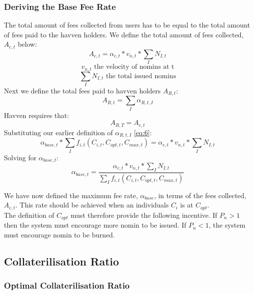 \subsubsection{Deriving the Base Fee Rate}The total amount of fees collected from users has to be equal to the total amount of fees paid to the havven holders. We define the total amount of fees collected, $A_{c,t}$ below: \\
\begin{equation}
A_{c,t}  = \alpha_{c,t} * v_{n,t} * \sum\limits_I N_{I,t}  \label{eq:8}
\end{equation}
$$ v_{n,t} \text{ the velocity of nomins at t} $$
$$  \sum\limits_I N_{I,t} \text{ the total issued nomins} $$
Next we define the total fees paid to havven holders $A_{R,t}$: \\
\begin{equation}
A_{R,t} = \sum\limits_I \alpha_{R,t,I} \label{eq:9}
\end{equation}
Havven requires that: \\
$$ A_{R,T} =  A_{c,t} $$
Substituting our earlier definition of $\alpha_{R,t,I}$ \eqref{eq:6}: \\
$$ \alpha_{base,t} *\sum\limits_I f_{i,t}(C_{i,t}, C_{opt,t}, C_{max,t}) =  \alpha_{c,t} * v_{n,t} * \sum\limits_I N_{I,t} $$
Solving for $\alpha_{base,t} $:\\
\begin{equation}
\alpha_{base,t} = \frac{\alpha_{c,t} * v_{n,t} * \sum\limits_I N_{I,t}}{\sum\limits_I f_{i,t}(C_{i,t}, C_{opt,t},C_{max,t})} \label{eq:10}
\end{equation}

\noindent We have now defined the maximum fee rate, $\alpha_{base}$, in terms of the fees collected, $A_{c,t}$. This rate should be achieved when an individuals $C_i$ is at $C_{opt}$. \\

\noindent The definition of $C_{opt}$ must therefore provide the following incentive. If $P_n > 1$ then the system must encourage more nomin to be issued. If $P_n < 1$, the system must encourage nomin to be burned. 

\newpage

\subsection{Collaterilisation Ratio}
\subsubsection{Optimal Collaterilisation Ratio}


